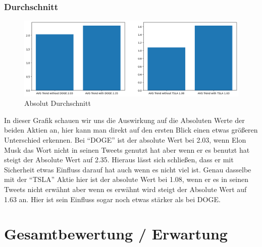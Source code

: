 \documentclass{article}
\begin{document}
\subsubsection{Durchschnitt}
\begin{figure}[!htb]
  	\includegraphics[width=\textwidth, center]{../imgs/Absolut_Durchschnitt.png}
 	\caption{Absolut Durchschnitt}
 	\label{fig:Absolut Durchschnitt}
\end{figure}
In dieser Grafik schauen wir uns die Auswirkung auf die Absoluten Werte der beiden Aktien an, hier kann man direkt auf den ersten Blick einen etwas größeren Unterschied erkennen.
Bei ``DOGE'' ist der absolute Wert bei 2.03, wenn Elon Musk das Wort nicht in seinen Tweets genutzt hat aber wenn er es benutzt hat steigt der Absolute Wert auf 2.35. Hieraus lässt sich schließen, dass er mit Sicherheit etwas Einfluss darauf hat auch wenn es nicht viel ist.
Genau dasselbe mit der ``TSLA'' Aktie hier ist der absolute Wert bei 1.08, wenn er es in seinen Tweets nicht erwähnt aber wenn es erwähnt wird steigt der Absolute Wert auf 1.63 an. Hier ist sein Einfluss sogar noch etwas stärker als bei DOGE.




\section{Gesamtbewertung / Erwartung}
\end{document}
